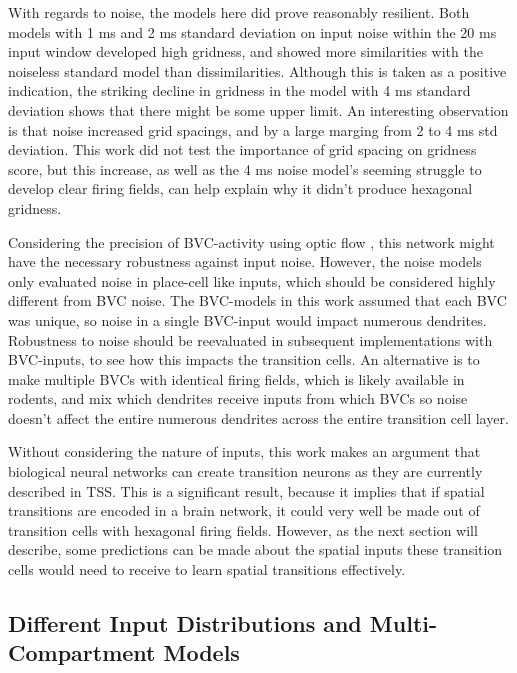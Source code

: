 \documentclass{article}
\begin{document}
    With regards to noise, the models here did prove reasonably resilient. Both models with 1 ms and 2 ms standard deviation on input noise within the 20 ms input window developed high gridness, and showed more similarities with the noiseless standard model than dissimilarities. Although this is taken as a positive indication, the striking decline in gridness in the model with 4 ms standard deviation shows that there might be some upper limit. An interesting observation is that noise increased grid spacings, and by a large marging from 2 to 4 ms std deviation. This work did not test the importance of grid spacing on gridness score, but this increase, as well as the 4 ms noise model's seeming struggle to develop clear firing fields, can help explain why it didn't produce hexagonal gridness.

    Considering the precision of BVC-activity using optic flow \parencite{Raudies2012}, this network might have the necessary robustness against input noise. However, the noise models only evaluated noise in place-cell like inputs, which should be considered highly different from BVC noise. The BVC-models in this work assumed that each BVC was unique, so noise in a single BVC-input would impact numerous dendrites. Robustness to noise should be reevaluated in subsequent implementations with BVC-inputs, to see how this impacts the transition cells. An alternative is to make multiple BVCs with identical firing fields, which is likely available in rodents, and mix which dendrites receive inputs from which BVCs so noise doesn't affect the entire numerous dendrites across the entire transition cell layer.

    Without considering the nature of inputs, this work makes an argument that biological neural networks can create transition neurons as they are currently described in TSS. This is a significant result, because it implies that if spatial transitions are encoded in a brain network, it could very well be made out of transition cells with hexagonal firing fields. However, as the next section will describe, some predictions can be made about the spatial inputs these transition cells would need to receive to learn spatial transitions effectively.   

    \subsection{Different Input Distributions and Multi-Compartment Models} \label{Future: BVCs}
\end{document}
